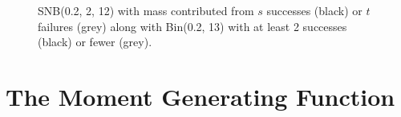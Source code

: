 \documentclass[review]{elsarticle}
\begin{document}
\begin{figure}[t!]
\centering
{}
\hfill
{}
\caption{
SNB(0.2, 2, 12) with mass contributed from 
$s$ successes (black) or $t$ failures (grey) along with Bin(0.2, 13) with
at least 2 successes (black) or fewer (grey).
}
\label{fig:snb_bin_compare}
\end{figure}

\section{The Moment Generating Function}
\end{document}

